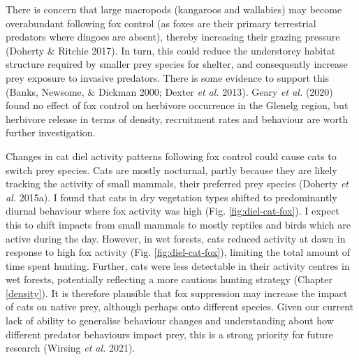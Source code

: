\documentclass[11pt,a4paper,titlepage,twoside,openright]{style/unimelbthesis}
\begin{document}
\begin{mainmatter}
There is concern that large macropods (kangaroos and wallabies) may become overabundant following fox control (as foxes are their primary terrestrial predators where dingoes are absent), thereby increasing their grazing pressure (Doherty \& Ritchie 2017). In turn, this could reduce the understorey habitat structure required by smaller prey species for shelter, and consequently increase prey exposure to invasive predators. There is some evidence to support this (Banks, Newsome, \& Dickman 2000; Dexter \emph{et al.} 2013). Geary \emph{et al.} (2020) found no effect of fox control on herbivore occurrence in the Glenelg region, but herbivore release in terms of density, recruitment rates and behaviour are worth further investigation.

Changes in cat diel activity patterns following fox control could cause cats to switch prey species. Cats are mostly nocturnal, partly because they are likely tracking the activity of small mammals, their preferred prey species (Doherty \emph{et al.} 2015a). I found that cats in dry vegetation types shifted to predominantly diurnal behaviour where fox activity was high (Fig. \ref{fig:diel-cat-fox}). I expect this to shift impacts from small mammals to mostly reptiles and birds which are active during the day. However, in wet forests, cats reduced activity at dawn in response to high fox activity (Fig. \ref{fig:diel-cat-fox}), limiting the total amount of time spent hunting. Further, cats were less detectable in their activity centres in wet forests, potentially reflecting a more cautious hunting strategy (Chapter \ref{density}). It is therefore plausible that fox suppression may increase the impact of cats on native prey, although perhaps onto different species. Given our current lack of ability to generalise behaviour changes and understanding about how different predator behaviours impact prey, this is a strong priority for future research (Wirsing \emph{et al.} 2021).


\end{mainmatter}
\end{document}
